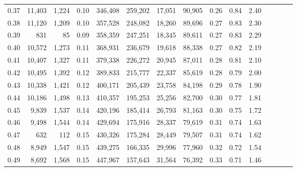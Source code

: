 \begin{tabular}{rrrcrrrrrrrrrrr}
0.37 &  11,403 &  1,224 &                                       0.10 &  346,408 &  259,202 &   17,051 &   90,905 &  0.26 &  0.84 &                         2.40 \\
0.38 &  11,120 &  1,209 &                                       0.10 &  357,528 &  248,082 &   18,260 &   89,696 &  0.27 &  0.83 &                         2.30 \\
0.39 &     831 &     85 &                                       0.09 &  358,359 &  247,251 &   18,345 &   89,611 &  0.27 &  0.83 &                         2.29 \\
0.40 &  10,572 &  1,273 &                                       0.11 &  368,931 &  236,679 &   19,618 &   88,338 &  0.27 &  0.82 &                         2.19 \\
0.41 &  10,407 &  1,327 &                                       0.11 &  379,338 &  226,272 &   20,945 &   87,011 &  0.28 &  0.81 &                         2.10 \\
0.42 &  10,495 &  1,392 &                                       0.12 &  389,833 &  215,777 &   22,337 &   85,619 &  0.28 &  0.79 &                         2.00 \\
0.43 &  10,338 &  1,421 &                                       0.12 &  400,171 &  205,439 &   23,758 &   84,198 &  0.29 &  0.78 &                         1.90 \\
0.44 &  10,186 &  1,498 &                                       0.13 &  410,357 &  195,253 &   25,256 &   82,700 &  0.30 &  0.77 &                         1.81 \\
0.45 &   9,839 &  1,537 &                                       0.14 &  420,196 &  185,414 &   26,793 &   81,163 &  0.30 &  0.75 &                         1.72 \\
0.46 &   9,498 &  1,544 &                                       0.14 &  429,694 &  175,916 &   28,337 &   79,619 &  0.31 &  0.74 &                         1.63 \\
0.47 &     632 &    112 &                                       0.15 &  430,326 &  175,284 &   28,449 &   79,507 &  0.31 &  0.74 &                         1.62 \\
0.48 &   8,949 &  1,547 &                                       0.15 &  439,275 &  166,335 &   29,996 &   77,960 &  0.32 &  0.72 &                         1.54 \\
0.49 &   8,692 &  1,568 &                                       0.15 &  447,967 &  157,643 &   31,564 &   76,392 &  0.33 &  0.71 &                         1.46 \\

\end{tabular}
